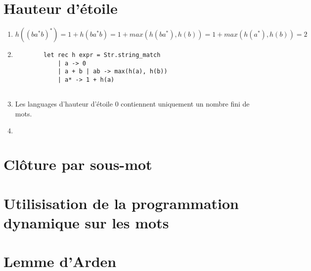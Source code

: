 \documentclass{article}
\begin{document}
\section{Hauteur d'\'etoile}

\begin{enumerate}
    \item $h((ba^*b)^*) = 1 + h(ba^*b) = 1 + max(h(ba^*), h(b)) = 1 + max(h(a^*), h(b)) = 2$
    \item \begin{verbatim}
        let rec h expr = Str.string_match
            | a -> 0
            | a + b | ab -> max(h(a), h(b))
            | a* -> 1 + h(a)
        
    \end{verbatim}
    \item Les languages d'hauteur d'\'etoile 0 contiennent uniquement un nombre fini de mots.
    \item 
\end{enumerate}

\section{Cl\^oture par sous-mot}

\section{Utilisisation de la programmation dynamique sur les mots}

\section{Lemme d'Arden}
\end{document}
